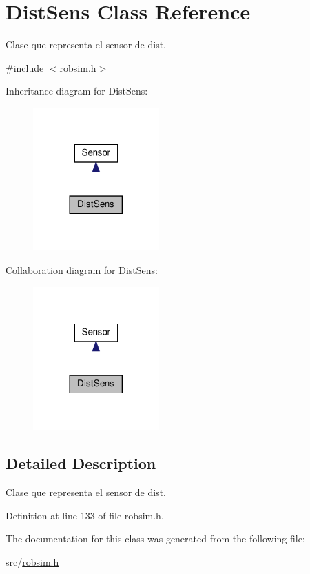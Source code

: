 \hypertarget{classDistSens}{}\section{Dist\+Sens Class Reference}
\label{classDistSens}


Clase que representa el sensor de dist.  




{\ttfamily \#include $<$robsim.\+h$>$}



Inheritance diagram for Dist\+Sens\+:\nopagebreak
\begin{figure}[H]
\begin{center}
\leavevmode
\includegraphics[width=137pt]{classDistSens__inherit__graph}
\end{center}
\end{figure}


Collaboration diagram for Dist\+Sens\+:\nopagebreak
\begin{figure}[H]
\begin{center}
\leavevmode
\includegraphics[width=137pt]{classDistSens__coll__graph}
\end{center}
\end{figure}


\subsection{Detailed Description}
Clase que representa el sensor de dist. 

Definition at line 133 of file robsim.\+h.



The documentation for this class was generated from the following file\+:\begin{DoxyCompactItemize}
\item 
src/\hyperlink{robsim_8h}{robsim.\+h}\end{DoxyCompactItemize}
